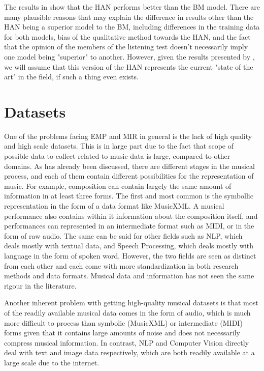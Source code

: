 The results in \cite{jeong2019virtuosonet} show that the HAN performs better than the BM model. There are many plausible reasons that may explain the difference in results other than the HAN being a superior model to the BM, including differences in the training data for both models, bias of the qualitative method towards the HAN, and the fact that the opinion of the members of the listening test doesn't necessarily imply one model being "superior" to another. However, given the results presented by \citet{jeong2019virtuosonet}, we will assume that this version of the HAN represents the current "state of the art" in the field, if such a thing even exists. 


\section{Datasets}
One of the problems facing EMP and MIR in general is the lack of high quality and high scale datasets\cite{cancino2018computational}. This is in large part due to the fact that scope of possible data to collect related to music data is large, compared to other domains. As has already been discussed, there are different stages in the musical process, and each of them contain different possibilities for the representation of music. For example, composition can contain largely the same amount of information in at least three forms. The first and most common is the symbollic representation in the form of a data format like MusicXML. A musical performance also contains within it information about the composition itself, and performances can represented in an intermediate format such as MIDI, or in the form of raw audio. The same can be said for other fields such as NLP, which deals mostly with textual data, and Speech Processing, which deals mostly with language in the form of spoken word. However, the two fields are seen as distinct from each other and each come with more standardization in both research methods and data formats. Musical data and information has not seen the same rigour in the literature. 

Another inherent problem with getting high-quality musical datasets is that most of the readily available musical data comes in the form of audio, which is much more difficult to process than symbolic (MusicXML) or intermediate (MIDI) forms given that it contains large amounts of noise and does not necessarily compress musical information. In contrast, NLP and Computer Vision directly deal with text and image data respectively, which are both readily available at a large scale due to the internet. 

